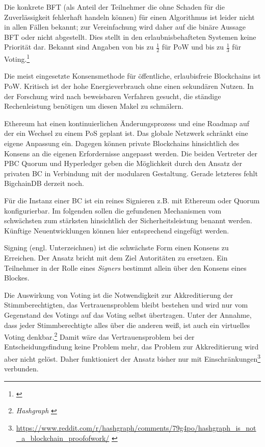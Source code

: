 Die konkrete \gls{BFT} (als Anteil der Teilnehmer die ohne Schaden für die Zuverlässigkeit fehlerhaft handeln können) für einen Algorithmus ist leider nicht in allen Fällen bekannt; zur Vereinfachung wird daher auf die binäre Aussage \gls{BFT} oder nicht abgestellt.
Dies stellt in den erlaubnisbehafteten Systemen keine Priorität dar.
Bekannt sind Angaben von bis zu \(\frac{1}{2}\) für \gls{PoW} und bis zu \(\frac{1}{3}\) für Voting.\footnote{\cite{p:hyperledger:consensus}}

Die meist eingesetzte Konsensmethode für öffentliche, erlaubisfreie Blockchains ist \gls{PoW}. 
Kritisch ist der hohe Energieverbrauch ohne einen sekundären Nutzen.
In der Forschung wird nach beweisbaren Verfahren gesucht, die ständige Rechenleistung benötigen um diesen Makel zu schmälern.

Ethereum hat einen kontinuierlichen Änderungsprozess und eine Roadmap auf der ein Wechsel zu einem \gls{PoS} geplant ist.
Das globale Netzwerk schränkt eine eigene Anpassung ein.
Dagegen können private Blockchains hinsichtlich des Konsens an die eigenen Erfordernisse angepasst werden. 
Die beiden Vertreter der \gls{PBC} Quorum und Hyperledger geben die Möglichkeit durch den Ansatz der privaten \gls{BC} in Verbindung mit der modularen Gestaltung.
Gerade letzteres fehlt BigchainDB derzeit noch.

Für die Instanz einer \gls{BC} ist ein reines Signieren z.B. mit Ethereum oder Quorum konfigurierbar.
Im folgenden sollen die gefundenen Mechanismen vom schwächsten zum stärksten hinsichtlich der Sicherheitsleistung benannt werden.
Künftige Neuentwicklungen können hier entsprechend eingefügt werden.

Signing (engl. Unterzeichnen) ist die schwächste Form einen Konsens zu Erreichen.
Der Ansatz bricht mit dem Ziel Autoritäten zu ersetzen.
Ein Teilnehmer in der Rolle eines \emph{Signers} bestimmt allein über den Konsens eines Blockes.

Die Auswirkung von Voting ist die Notwendigkeit zur Akkreditierung der Stimmberechtigten, das Vertrauensproblem bleibt bestehen und wird nur vom Gegenstand des Votings auf das Voting selbst übertragen.
Unter der Annahme, dass jeder Stimmberechtigte alles über die anderen weiß, ist auch ein virtuelles Voting denkbar.\footnote{\emph{Hashgraph} \autocite{p:hashgraph}}
Damit wäre das Vertrauensproblem bei der Entscheidungsfindung keine Problem mehr, das Problem zur Akkreditierung wird aber nicht gelöst.
Daher funktioniert der Ansatz bisher nur mit Einschränkungen\footnote{\url{https://www.reddit.com/r/hashgraph/comments/79g4po/hashgraph_is_not_a_blockchain_proofofwork/}  \autocite{w:reddit}} verbunden.

